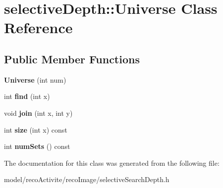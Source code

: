 \section{selective\+Depth\+:\+:Universe Class Reference}
\label{classselective_depth_1_1_universe}
\subsection*{Public Member Functions}
\begin{DoxyCompactItemize}
\item 
\mbox{\label{classselective_depth_1_1_universe_a7557a2a93c9e2708366f317d46cd8e64}} 
{\bfseries Universe} (int num)
\item 
\mbox{\label{classselective_depth_1_1_universe_a3b22248be73dccc078ecf00c7d5d283e}} 
int {\bfseries find} (int x)
\item 
\mbox{\label{classselective_depth_1_1_universe_abc6256b32cfff6d2fa22511dc7003cf2}} 
void {\bfseries join} (int x, int y)
\item 
\mbox{\label{classselective_depth_1_1_universe_ad7c55b559a1dfdf375dfc1cd4d35f2b0}} 
int {\bfseries size} (int x) const
\item 
\mbox{\label{classselective_depth_1_1_universe_a80057a5312e715f231650b647afa43e9}} 
int {\bfseries num\+Sets} () const
\end{DoxyCompactItemize}


The documentation for this class was generated from the following file\+:\begin{DoxyCompactItemize}
\item 
model/reco\+Activite/reco\+Image/selective\+Search\+Depth.\+h\end{DoxyCompactItemize}
